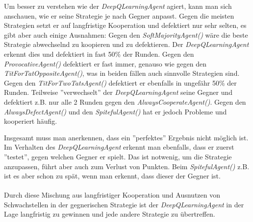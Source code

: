 Um besser zu verstehen wie der \textit{DeepQLearningAgent} agiert, kann man sich anschauen, wie er seine Strategie
je nach Gegner anpasst. Gegen die meisten Strategien setzt er auf langfristige Kooperation und defektiert nur sehr selten, es gibt
aber auch einige Ausnahmen:
Gegen den \textit{SoftMajorityAgent()} wäre die beste Strategie abwechselnd zu koopieren und zu defektieren. Der
\textit{DeepQLearningAgent} erkennt dies und defektiert in fast 50\% der Runden. Gegen den \textit{ProvocativeAgent()} defektiert er
fast immer, genauso wie gegen den \textit{TitForTatOppositeAgent()}, was in beiden fällen auch sinnvolle Strategien sind. Gegen den 
\textit{TitForTwoTatsAgent()} defektiert er ebenfalls in ungefähr 50\% der Runden. Teilweise ''verwechselt'' der \textit{DeepQLearningAgent}
seine Gegner und defektiert z.B. nur alle 2 Runden gegen den \textit{AlwaysCooperateAgent()}. Gegen den \textit{AlwaysDefectAgent()}
und den \textit{SpitefulAgent()} hat er jedoch Probleme und kooperiert häufig. 

Insgesamt muss man anerkennen, dass ein ''perfektes'' Ergebnis nicht möglich ist. Im Verhalten des \textit{DeepQLearningAgent} erkennt man ebenfalls,
dass er zuerst ''testet'', gegen welchen Gegner er spielt. Das ist notwenig, um die Strategie anzupassen, führt aber auch zum Verlust von Punkten.
Beim \textit{SpitefulAgent()} z.B. ist es aber schon zu spät, wenn man erkennt, dass dieser der Gegner ist. \\ \\
Durch diese Mischung aus langfristiger Kooperation und Ausnutzen von Schwachstellen in der gegnerischen Strategie ist der 
\textit{DeepQLearningAgent} in der Lage langfristig zu gewinnen und jede andere Strategie zu übertreffen.